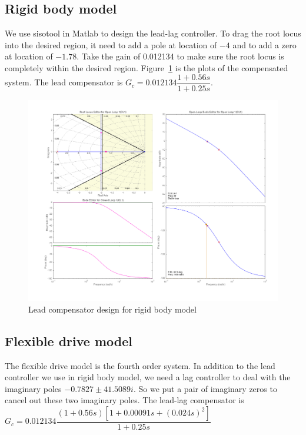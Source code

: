 \documentclass[a4paper, 12pt]{article}
\begin{document}
\subsection{Rigid body model}
\hspace{2.5ex} We use sisotool in Matlab to design the lead-lag controller. To drag the root locus into the desired region, it need to add a pole at location of $-4$ and to add a zero at location of $-1.78$. Take the gain of 0.012134 to make sure the root locus is completely within the desired region. Figure~\ref{LeadLagController} is the plots of the compensated system. The lead compensator is $G_c = 0.012134\dfrac{1+0.56s}{1+0.25s}$.

\begin{figure}[!htbp]
\centering
\includegraphics[width = 1\linewidth]{LeadLagController}
\caption{Lead compensator design for rigid body model}
\label{LeadLagController}
\end{figure}

\subsection{Flexible drive model}
\hspace{2.5ex} The flexible drive model is the fourth order system. In addition to the lead controller we use in rigid body model, we need a lag controller to deal with the imaginary poles $-0.7827\pm 41.5089i$. So we put a pair of imaginary zeros to cancel out these two imaginary poles. The lead-lag compensator is $G_c = 0.012134\dfrac{(1+0.56s)[1+0.00091s+ (0.024s)^2]}{1+0.25s}$
\end{document}
